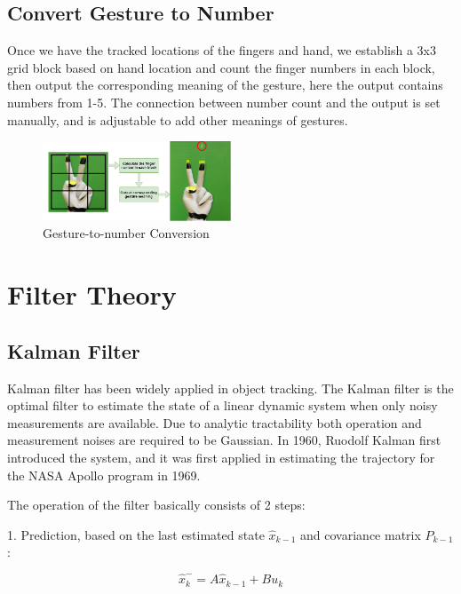 \documentclass[10pt,twocolumn,letterpaper]{article}
\begin{document}
\subsection{Convert Gesture to Number}

Once we have the tracked locations of the fingers and hand, we establish a 3x3 grid block based on hand location and count the finger numbers in each block, then output the corresponding meaning of the gesture, here the output contains numbers from 1-5. The connection between number count and the output is set manually, and is adjustable to add other meanings of gestures.

\begin{figure}[h]
     \centering
       \includegraphics[width=0.5\textwidth]{duchen_2.png}
         \caption{\small{Gesture-to-number Conversion}}
         \label{fig: conversion}
 \end{figure}

\section{Filter Theory}

\subsection{Kalman Filter}

Kalman filter has been widely applied in object tracking. The Kalman filter is the optimal filter to estimate the state of a linear dynamic system when only noisy measurements are available\cite{ref:botond2008}. Due to analytic tractability both operation and measurement noises are required to be Gaussian. In 1960, Ruodolf Kalman first introduced the system\cite{ref:kalman}, and it was first applied in estimating the trajectory for the NASA Apollo program in 1969\cite{ref:grewal}.

The operation of the filter basically consists of 2 steps:

1. Prediction, based on the last estimated state $\hat{x}_{k-1}$ and covariance matrix $P_{k-1}$:

\begin{equation}
\hat{x}_k^-=A\hat{x}_{k-1}+Bu_k
\end{equation}
\end{document}
